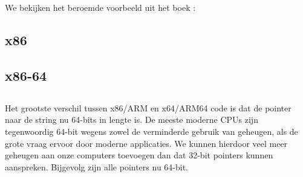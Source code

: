 \section{\HelloWorldSectionName}
\label{sec:helloworld}

We bekijken het beroemde voorbeeld uit het boek \KRBook:



\subsection{x86}




\subsection{x86-64}







\subsection{\Conclusion{}}

Het grootste verschil tussen x86/ARM en x64/ARM64 code is dat de pointer naar de string nu 64-bits in lengte is.
De meeste moderne \ac{CPU}s zijn tegenwoordig 64-bit wegens zowel de verminderde gebruik van geheugen, als de grote vraag ervoor door moderne applicaties.
We kunnen hierdoor veel meer geheugen aan onze computers toevoegen dan dat 32-bit pointers kunnen aanspreken.
Bijgevolg zijn alle pointers nu 64-bit.


